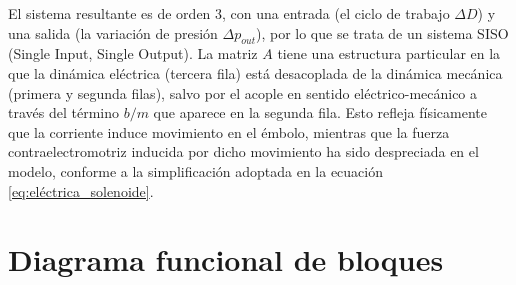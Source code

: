 \documentclass[journal]{IEEEtran}
\begin{document}
El sistema resultante es de orden 3, con una entrada (el ciclo de trabajo 
$\Delta D$) y una salida (la variación de presión $\Delta p_{out}$), por lo 
que se trata de un sistema SISO (Single Input, Single Output). La matriz $A$ 
tiene una estructura particular en la que la dinámica eléctrica (tercera 
fila) está desacoplada de la dinámica mecánica (primera y segunda filas), 
salvo por el acople en sentido eléctrico-mecánico a través del término 
$b/m$ que aparece en la segunda fila. Esto refleja físicamente que la 
corriente induce movimiento en el émbolo, mientras que la fuerza 
contraelectromotriz inducida por dicho movimiento ha sido despreciada en 
el modelo, conforme a la simplificación adoptada en la ecuación 
\eqref{eq:eléctrica_solenoide}.

\section{Diagrama funcional de bloques}
\end{document}
